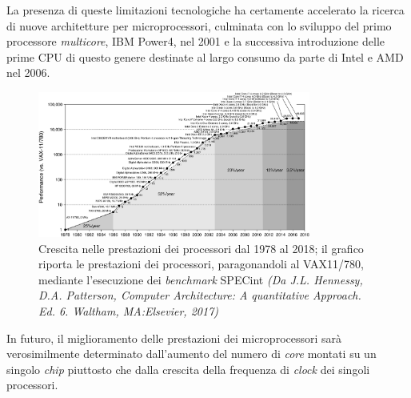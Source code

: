 La presenza di queste limitazioni tecnologiche ha certamente accelerato la ricerca di nuove architetture per microprocessori, culminata con lo sviluppo del primo processore \textit{multicore}, IBM Power4, nel 2001 e la successiva introduzione delle prime CPU di questo genere destinate al largo consumo da parte di Intel e AMD nel 2006.
\begin{figure}[htbp]
    \centering
    \includegraphics[width=0.8\textwidth]{../Risorse/Capitolo 1/PrestazioniProcessori}

    \caption{Crescita nelle prestazioni dei processori dal 1978 al 2018; il grafico riporta le prestazioni dei processori, paragonandoli al VAX11/780, mediante l'esecuzione dei \textit{benchmark} SPECint \small{\textit{(Da J.L. Hennessy, D.A. Patterson, Computer Architecture: A quantitative Approach. Ed. 6. Waltham, MA:Elsevier, 2017)}}}
    \label{fig:PrestazioniProcessori}
\end{figure}\newline
In futuro, il miglioramento delle prestazioni dei microprocessori sar\`a verosimilmente determinato dall'aumento del numero di \textit{core} montati su un singolo \textit{chip} piuttosto che dalla crescita della frequenza di \textit{clock} dei singoli processori.